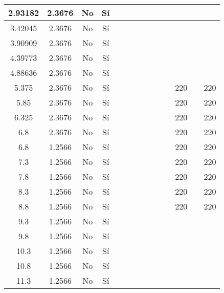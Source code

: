 \begin{table}[H]
{\begin{tabular}{|c|c|c|c|c|c|c|c|c|c|c|c|c|c|}
\hline
2.93182 & 2.3676 & No  & Sí  &     &     &     &     &     &     &     &     &     &  \bigstrut\\
\hline
3.42045 & 2.3676 & No  & Sí  &     &     &     &     &     &     &     &     &     &  \bigstrut\\
\hline
3.90909 & 2.3676 & No  & Sí  &     &     &     &     &     &     &     &     &     &  \bigstrut\\
\hline
4.39773 & 2.3676 & No  & Sí  &     &     &     &     &     &     &     &     &     &  \bigstrut\\
\hline
4.88636 & 2.3676 & No  & Sí  &     &     &     &     &     &     &     &     &     &  \bigstrut\\
\hline
5.375 & 2.3676 & No  & Sí  &     &     &     &     &     &     &     & 220 &     & 220 \bigstrut\\
\hline
5.85 & 2.3676 & No  & Sí  &     &     &     &     &     &     &     & 220 &     & 220 \bigstrut\\
\hline
6.325 & 2.3676 & No  & Sí  &     &     &     &     &     &     &     & 220 &     & 220 \bigstrut\\
\hline
6.8 & 2.3676 & No  & Sí  &     &     &     &     &     &     &     & 220 &     & 220 \bigstrut\\
\hline
6.8 & 1.2566 & No  & Sí  &     &     &     &     &     &     &     & 220 &     & 220 \bigstrut\\
\hline
7.3 & 1.2566 & No  & Sí  &     &     &     &     &     &     &     & 220 &     & 220 \bigstrut\\
\hline
7.8 & 1.2566 & No  & Sí  &     &     &     &     &     &     &     & 220 &     & 220 \bigstrut\\
\hline
8.3 & 1.2566 & No  & Sí  &     &     &     &     &     &     &     & 220 &     & 220 \bigstrut\\
\hline
8.8 & 1.2566 & No  & Sí  &     &     &     &     &     &     &     & 220 &     & 220 \bigstrut\\
\hline
9.3 & 1.2566 & No  & Sí  &     &     &     &     &     &     &     &     &     &  \bigstrut\\
\hline
9.8 & 1.2566 & No  & Sí  &     &     &     &     &     &     &     &     &     &  \bigstrut\\
\hline
10.3 & 1.2566 & No  & Sí  &     &     &     &     &     &     &     &     &     &  \bigstrut\\
\hline
10.8 & 1.2566 & No  & Sí  &     &     &     &     &     &     &     &     &     &  \bigstrut\\
\hline
11.3 & 1.2566 & No  & Sí  &     &     &     &     &     &     &     &     &     &  \bigstrut\\

\end{tabular}}
\end{table}
